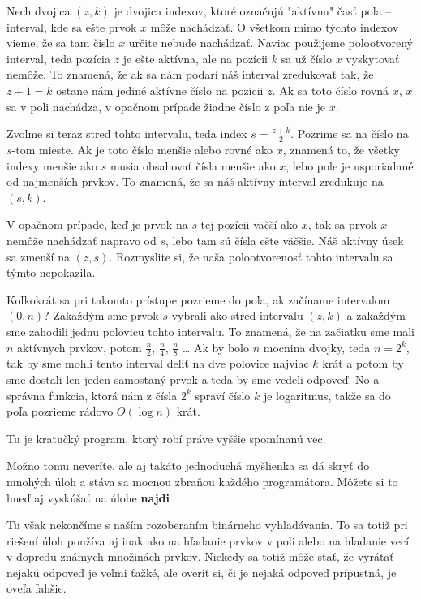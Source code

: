 Nech dvojica $(z, k)$ je dvojica indexov, ktoré označujú "aktívnu" časť poľa -- interval, kde sa ešte
prvok $x$ môže nachádzať. O všetkom mimo týchto indexov vieme, že sa tam číslo $x$ určite nebude
nachádzať. Naviac použijeme polootvorený interval, teda pozícia $z$ je ešte aktívna, ale na pozícii
$k$ sa už číslo $x$ vyskytovať nemôže. To znamená, že ak sa nám podarí náš interval zredukovať tak,
že $z+1 = k$ ostane nám jediné aktívne číslo na pozícii $z$. Ak sa toto číslo rovná $x$, $x$ sa v
poli nachádza, v opačnom prípade žiadne číslo z poľa nie je $x$.

Zvoľme si teraz stred tohto intervalu, teda index $s = \frac{z+k}{2}$. Pozrime sa na číslo na
$s$-tom mieste. Ak je toto číslo menšie alebo rovné ako $x$, znamená to, že všetky indexy menšie ako
$s$ musia obsahovať čísla menšie ako $x$, lebo pole je usporiadané od najmenších prvkov. To znamená,
že sa náš aktívny interval zredukuje na $(s, k)$.

V opačnom prípade, keď je prvok na $s$-tej pozícii väčší ako $x$, tak sa prvok $x$ nemôže nachádzať
napravo od $s$, lebo tam sú čísla ešte väčšie. Náš aktívny úsek sa zmenší na $(z, s)$. Rozmyslite
si, že naša polootvorenosť tohto intervalu sa týmto nepokazila.

Koľkokrát sa pri takomto prístupe pozrieme do poľa, ak začíname intervalom $(0, n)$? Zakaždým sme prvok $s$ vybrali ako stred
intervalu $(z, k)$ a zakaždým sme zahodili jednu polovicu tohto intervalu. To znamená, že na
začiatku sme mali $n$ aktívnych prvkov, potom $\frac{n}{2}$, $\frac{n}{4}$, $\frac{n}{8}$ \dots
Ak by bolo $n$ mocnina dvojky, teda $n = 2^k$, tak by sme mohli tento interval deliť na dve polovice najviac
$k$ krát a potom by sme dostali len jeden samostaný prvok a teda by sme vedeli odpoveď. No a správna
funkcia, ktorá nám z čísla $2^k$ spraví číslo $k$ je logaritmus, takže sa do poľa pozrieme rádovo
$O(\log n)$ krát.

Tu je kratučký program, ktorý robí práve vyššie spomínanú vec.


Možno tomu neveríte, ale aj takáto jednoduchá myšlienka sa dá skryť do mnohých úloh a stáva sa
mocnou zbraňou každého programátora. Môžete si to hneď aj vyskúšať na úlohe \textbf{najdi}


Tu však nekončíme s naším rozoberaním binárneho vyhľadávania. To sa totiž pri riešení úloh používa
aj inak ako na hľadanie prvkov v poli alebo na hľadanie vecí v dopredu známych množinách prvkov.
Niekedy sa totiž môže stať, že vyrátať nejakú odpoveď je veľmi ťažké, ale overiť si, či je nejaká
odpoveď prípustná, je oveľa ľahšie.

